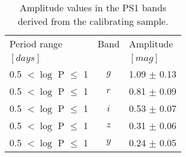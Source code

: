 \begin{table}[htdp]
\caption{Amplitude values in the PS1 bands derived from the calibrating sample.}
\begin{center}
\begin{tabular}{lcl}
Period range &    Band  &    Amplitude\\
$\left[days\right]$ & & $\left[mag\right]$\\
\hline \hline
0.5 $<\log$ P $\leqslant$ 1 &   $g$  & 1.09 $\pm$ 0.13\\
 0.5 $<\log$ P $\leqslant$ 1 &   $ r $  & 0.81 $\pm$ 0.09\\
0.5 $<\log$ P $\leqslant$ 1  & $  i $ & 0.53 $\pm$ 0.07\\
 0.5 $<\log$ P $\leqslant$ 1  & $ z $ & 0.31 $\pm$ 0.06\\
 0.5 $<\log$ P $\leqslant$ 1   &$ y $ & 0.24 $\pm$ 0.05\\
 \end{tabular}
\end{center}
\label{default}
\end{table}%